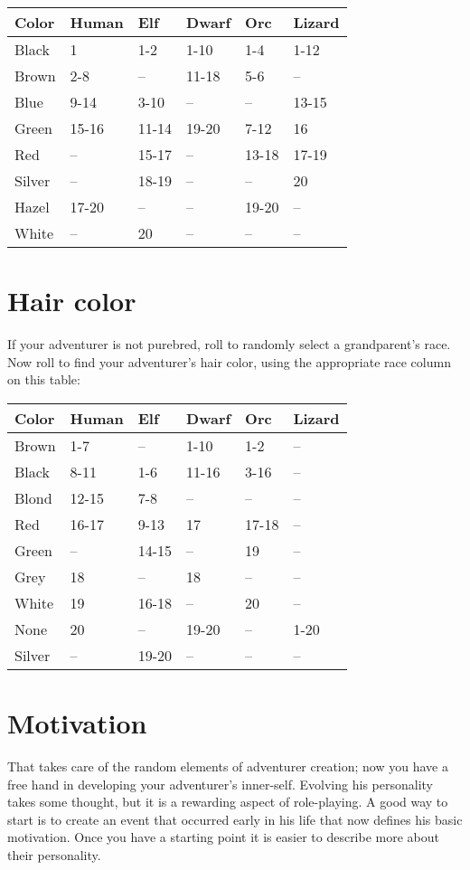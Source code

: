 \begin{multicols*}{2}
\begin{normbox}
\begin{tabular}{l l l l l l}
Color & Human & Elf & Dwarf & Orc & Lizard\\
\midrule
Black & 1 & 1-2 & 1-10 & 1-4 & 1-12\\
Brown & 2-8 & -- & 11-18 & 5-6 & --\\
Blue & 9-14 & 3-10 & -- & -- & 13-15\\
Green & 15-16 & 11-14 & 19-20 & 7-12 & 16\\
Red & -- & 15-17 & -- & 13-18 & 17-19\\
Silver & -- & 18-19 & -- & -- & 20\\
Hazel & 17-20 & -- & -- & 19-20 & --\\
White & -- & 20 & -- & -- & --
\end{tabular}
\end{normbox}
\section{Hair color}
If your adventurer is not purebred, roll  to randomly select a grandparent's race. Now roll  to find your adventurer's hair color, using the appropriate race column on this table:
\begin{normbox}
\begin{tabular}{l l l l l l}
Color & Human & Elf & Dwarf & Orc & Lizard\\
\midrule

Brown & 1-7 & -- & 1-10 & 1-2 & --\\
Black & 8-11 & 1-6 & 11-16 & 3-16 & --\\
Blond & 12-15 & 7-8 & -- & -- & --\\
Red & 16-17 & 9-13 & 17 & 17-18 & --\\
Green & -- & 14-15 & -- & 19 & --\\
Grey & 18 & -- & 18 & -- & --\\
White & 19 & 16-18 & -- & 20 & --\\
None & 20 & -- & 19-20 & -- & 1-20\\
Silver & -- & 19-20 & -- & -- & --
\end{tabular}
\end{normbox}
\section{Motivation}
That takes care of the random elements of adventurer creation; now you have a free hand in developing your adventurer's inner-self. Evolving his personality takes some thought, but it is a rewarding aspect of role-playing. A good way to start is to create an event that occurred early in his life that now defines his basic motivation. Once you have a starting point it is easier to describe more about their personality.


\end{multicols*}
